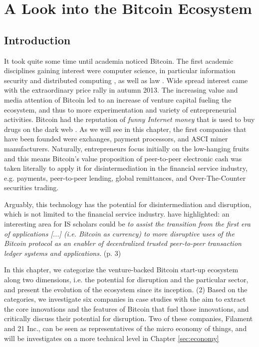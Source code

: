 \chapter{A Look into the Bitcoin Ecosystem}

\section{Introduction}






It took quite some time until academia noticed Bitcoin. The first academic disciplines gaining interest were computer science, in particular information security \parencite{Karame:2012:DFP:2382196.2382292,Barber2012} and distributed computing \parencite{Babaioff:2012:BRB:2229012.2229022}, as well as law \parencite{Grinberg2011,Ewing2012}. Wide spread interest came with the extraordinary price rally in autumn 2013. The increasing value and media attention of Bitcoin led to an increase of venture capital fueling the ecosystem, and thus to more experimentation and variety of entrepreneurial activities. Bitcoin had the reputation of \emph{funny Internet money} that is used to buy drugs on the dark web \parencite{Christin:2013:TSR:2488388.2488408}. As we will see in this chapter, the first companies that have been founded were exchanges, payment processors, and ASCI miner manufacturers.
Naturally, entrepreneurs focus initially on the low-hanging fruits and this means Bitcoin's value proposition of peer-to-peer electronic cash was taken literally to apply it for disintermediation in the financial service industry, e.g. payments, peer-to-peer lending, global remittances, and Over-The-Counter securities trading. 

Arguably, this technology has the potential for disintermediation and disruption, which is not limited to the financial service industry. \cite{Giaglis2014} have highlighted: an interesting area 
for IS scholars could be \emph{to assist the transition from the first era of applications 
[...] (i.e. Bitcoin as currency) to more disruptive uses of the Bitcoin protocol 
as an enabler of decentralized trusted peer-to-peer transaction ledger systems 
and applications.} (p. 3)

In this chapter, we categorize the venture-backed Bitcoin start-up 
ecosystem along two dimensions, i.e. the potential for disruption and the particular 
sector, and present the evolution of the ecosystem since its inception. (2) Based 
on the categories, we investigate six companies in case studies with the aim to 
extract the core innovations and the features of Bitcoin that fuel those innovations, 
and critically discuss their potential for disruption. Two of these companies, Filament and 21 Inc., can be seen as representatives of the micro economy of things, and will be investigates on a more technical level in Chapter \ref{sec:economy}

